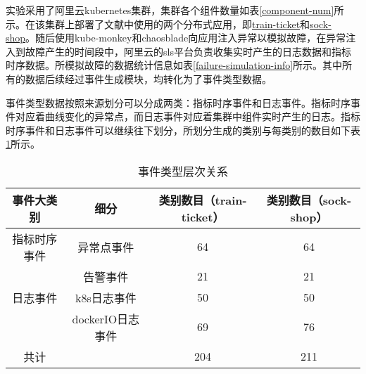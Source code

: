 实验采用了阿里云kubernetes集群，集群各个组件数量如表\ref{component-num}所示。在该集群上部署了文献\parencite{qiu2020causality-mining-knowledge-graph,}中使用的两个分布式应用，即\href{https://github.com/FudanSELab/train-ticket}{train-ticket}和\href{https://github.com/microservices-demo/microservices-demo}{sock-shop}。随后使用kube-monkey和chaosblade向应用注入异常以模拟故障，在异常注入到故障产生的时间段中，阿里云的sls平台负责收集实时产生的日志数据和指标时序数据。所模拟故障的数据统计信息如表\ref{failure-simulation-info}所示。其中所有的数据后续经过事件生成模块，均转化为了事件类型数据。

事件类型数据按照来源划分可以分成两类：指标时序事件和日志事件。指标时序事件对应着曲线变化的异常点，而日志事件对应着集群中组件实时产生的日志。指标时序事件和日志事件可以继续往下划分，所划分生成的类别与每类别的数目如下表\ref{event-type-level}所示。
\begin{table}[htbp]
    \caption{事件类型层次关系}
    \label{event-type-level}
    \begin{tabular}{cccc}
    \hline
    事件大类别    & 细分           & 类别数目（train-ticket） & 类别数目（sock-shop） \\ \hline
    指标时序事件 & 异常点事件        & 64                 & 64              \\
             & 告警事件         & 21                 & 21              \\ \hline
    日志事件    & k8s日志事件      & 50                 & 50              \\
             & dockerIO日志事件 & 69                 & 76              \\ \hline
    共计       &              & 204                & 211             \\ \hline
    \end{tabular}
    \end{table}

